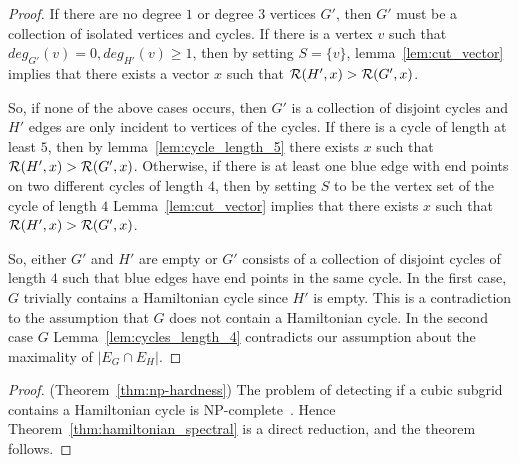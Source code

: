 \begin{proof}
If there are no degree $1$ or degree $3$ vertices $G'$, then $G'$ must be a collection of isolated vertices and cycles. If there is a vertex $v$ such that $deg_{G'}(v) = 0, deg_{H'}(v) \geq 1$, then by setting $S = \{v\}$, lemma~\ref{lem:cut_vector} implies that there exists a vector $x$ such that ${\cal R}(H',x)>{\cal R}(G',x)$. 


So, if none of the above cases occurs, then $G'$ is a collection of disjoint cycles and $H'$ edges are only incident to vertices of the cycles. If there is a cycle of length at least $5$, then by lemma~\ref{lem:cycle_length_5} there exists $x$ such that ${\cal R}(H',x)>{\cal R}(G',x)$. Otherwise, if there is at least one blue edge with end points on two different cycles of length $4$, then by setting $S$ to be the vertex set of the cycle of length $4$ Lemma~\ref{lem:cut_vector} implies that there exists $x$ such that ${\cal R}(H',x)>{\cal R}(G',x)$. 

So, either $G'$ and $H'$ are empty or $G'$ consists of a collection of disjoint cycles of length $4$ such that blue edges have end points in the same cycle. In the first case, $G$ trivially contains a Hamiltonian cycle since $H'$ is empty. This is a contradiction to the assumption that $G$ does not contain a Hamiltonian cycle. 
In the second case $G$ Lemma~\ref{lem:cycles_length_4} contradicts our assumption about the maximality
of $|E_G\cap E_H|$. 
\end{proof}


\begin{proof}(Theorem~\ref{thm:np-hardness})
The problem of detecting if a cubic subgrid contains a Hamiltonian cycle is NP-complete~\cite{PapadimitriouV84}.
Hence Theorem~\ref{thm:hamiltonian_spectral}  is a direct reduction, and the theorem follows. 
\end{proof}




\medskip